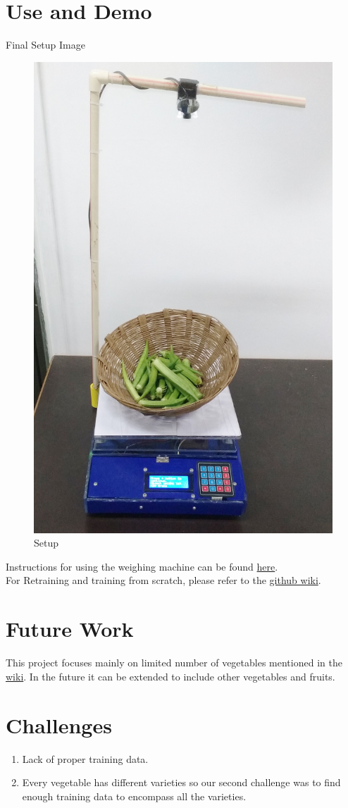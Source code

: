 \documentclass[a4paper,12pt,oneside]{book}
\begin{document}
\section{Use and Demo}
Final Setup Image
\begin{figure}[!ht]
	\centering
	\includegraphics[width=0.5\linewidth]{setup.jpg}
	\caption{Setup}
	\label{fig:setup}
\end{figure}


Instructions for using the weighing machine can be found \href{https://github.com/eYSIP-2017/eYSIP-2017_Vegetable-Identification-Using-Transfer-Learning/tree/master/Documentation/Manuals}{here}.\\
For Retraining and training from scratch, please refer to the \href{https://github.com/eYSIP-2017/eYSIP-2017_Vegetable-Identification-Using-Transfer-Learning/wiki}{github wiki}.

 

\section{Future Work}
This project focuses mainly on limited number of vegetables mentioned in the \href{https://github.com/eYSIP-2017/eYSIP-2017_Vegetable-Identification-Using-Transfer-Learning/wiki/List-of-Vegetables}{wiki}. In the future it can be extended to include other vegetables and fruits.

\section{Challenges}
\begin{enumerate}
	\item Lack of proper training data.
	\item Every vegetable has different varieties so our second challenge was to find enough training data to encompass all the varieties.
\end{enumerate}
\end{document}

